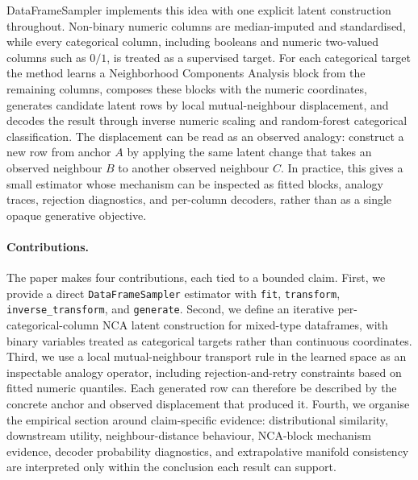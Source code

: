 DataFrameSampler implements this idea with one explicit latent construction
throughout. Non-binary numeric columns are median-imputed and standardised,
while every categorical column, including booleans and numeric two-valued
columns such as $0/1$, is treated as a supervised target. For each categorical
target the method learns a Neighborhood Components Analysis block from the
remaining columns, composes these blocks with the numeric coordinates, generates
candidate latent rows by local mutual-neighbour displacement, and decodes the
result through inverse numeric scaling and random-forest categorical
classification. The displacement can be read as an observed analogy: construct
a new row from anchor $A$ by applying the same latent change that takes an
observed neighbour $B$ to another observed neighbour $C$. In practice, this
gives a small estimator whose mechanism can be inspected as fitted blocks,
analogy traces, rejection diagnostics, and per-column decoders, rather than as
a single opaque generative objective.

\paragraph{Contributions.}
The paper makes four contributions, each tied to a bounded claim. First, we
provide a direct \texttt{DataFrameSampler} estimator with \texttt{fit},
\texttt{transform}, \texttt{inverse\_transform}, and \texttt{generate}. Second,
we define an iterative per-categorical-column NCA latent construction for
mixed-type dataframes, with binary variables treated as categorical targets
rather than continuous coordinates. Third, we use a local mutual-neighbour
transport rule in the learned space as an inspectable analogy operator,
including rejection-and-retry constraints based on fitted numeric quantiles.
Each generated row can therefore be described by
the concrete anchor and observed displacement that produced it. Fourth, we organise the empirical section around
claim-specific evidence: distributional similarity, downstream utility,
neighbour-distance behaviour, NCA-block mechanism evidence, decoder probability
diagnostics, and extrapolative manifold consistency are interpreted only within
the conclusion each result can support.
